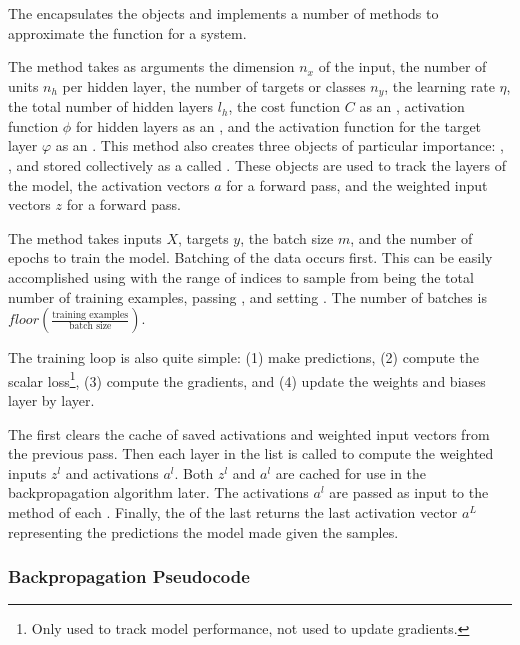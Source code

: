 \documentclass{article}
\begin{document}
The  encapsulates the  objects and
implements a number of methods to approximate the function for a system.

The  method takes as arguments the dimension $n_x$ of the input,
the number of units $n_h$ per hidden layer, the number of targets or
classes $n_y$, the learning rate $\eta$, the total number of hidden layers $l_h$,
the cost function $C$ as an ,
activation function $\phi$ for hidden layers as an ,
and the activation function for the target layer $\varphi$ as an .
This method
also creates three  objects of particular importance:
, , and
 stored collectively as a 
called . These  objects are used to
track the layers of the model, the activation vectors $a$ for a forward pass,
and the weighted input vectors $z$ for a forward pass.

The  method takes inputs $X$, targets $y$, the batch size $m$,
and the number of epochs to train the model. Batching of the data occurs first.
This can be easily accomplished using  with
the range of indices to sample from being the total number of training examples,
passing , and setting .
The number of batches is $floor(\frac{\text{training examples}}{\text{batch size}})$.

The training loop is also quite simple: (1) make predictions, (2) compute the scalar
loss\footnote{Only used to track model performance, not used to
	update gradients.},
(3) compute the gradients, and (4) update the weights and biases layer by layer.

The  first clears the cache of saved activations and
weighted input vectors from the previous pass. Then each layer in the
 list is called to compute the weighted inputs $z^{l}$ and
activations $a^{l}$. Both $z^{l}$ and $a^{l}$ are cached for use in the
backpropagation algorithm later. The activations $a^{l}$ are passed as
input to the  method of each .
Finally, the  of the last  returns the
last activation vector $a^{L}$ representing the predictions the model made
given the samples.

\subsubsection{Backpropagation Pseudocode}
\end{document}

